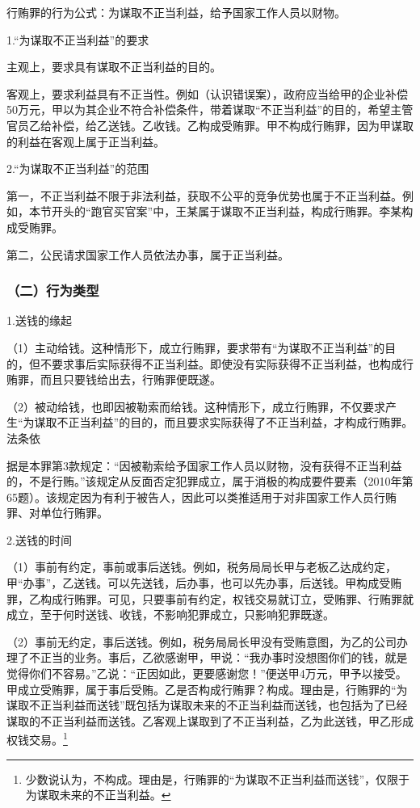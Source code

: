 行贿罪的行为公式：为谋取不正当利益，给予国家工作人员以财物。

1.“为谋取不正当利益”的要求

主观上，要求具有谋取不正当利益的目的。

客观上，要求利益具有不正当性。例如（认识错误案），政府应当给甲的企业补偿50万元，甲以为其企业不符合补偿条件，带着谋取“不正当利益”的目的，希望主管官员乙给补偿，给乙送钱。乙收钱。乙构成受贿罪。甲不构成行贿罪，因为甲谋取的利益在客观上属于正当利益。

2.“为谋取不正当利益”的范围

第一，不正当利益不限于非法利益，获取不公平的竞争优势也属于不正当利益。例如，本节开头的“跑官买官案”中，王某属于谋取不正当利益，构成行贿罪。李某构成受贿罪。

第二，公民请求国家工作人员依法办事，属于正当利益。

\subsubsection*{（二）行为类型}

1.送钱的缘起

（1）主动给钱。这种情形下，成立行贿罪，要求带有“为谋取不正当利益”的目的，但不要求事后实际获得不正当利益。即使没有实际获得不正当利益，也构成行贿罪，而且只要钱给出去，行贿罪便既遂。

（2）被动给钱，也即因被勒索而给钱。这种情形下，成立行贿罪，不仅要求产生“为谋取不正当利益”的目的，而且要求实际获得了不正当利益，才构成行贿罪。法条依

据是本罪第3款规定：“因被勒索给予国家工作人员以财物，没有获得不正当利益的，不是行贿。”该规定从反面否定犯罪成立，属于消极的构成要件要素（2010年第65题）。该规定因为有利于被告人，因此可以类推适用于对非国家工作人员行贿罪、对单位行贿罪。

2.送钱的时间

（1）事前有约定，事前或事后送钱。例如，税务局局长甲与老板乙达成约定，甲“办事”，乙送钱。可以先送钱，后办事，也可以先办事，后送钱。甲构成受贿罪，乙构成行贿罪。可见，只要事前有约定，权钱交易就订立，受贿罪、行贿罪就成立，至于何时送钱、收钱，不影响犯罪成立，只影响犯罪既遂。

（2）事前无约定，事后送钱。例如，税务局局长甲没有受贿意图，为乙的公司办理了不正当的业务。事后，乙欲感谢甲，甲说：“我办事时没想图你们的钱，就是觉得你们不容易。”乙说：“正因如此，更要感谢您！”便送甲4万元，甲予以接受。甲成立受贿罪，属于事后受贿。乙是否构成行贿罪？构成。理由是，行贿罪的“为谋取不正当利益而送钱”既包括为谋取未来的不正当利益而送钱，也包括为了已经谋取的不正当利益而送钱。乙客观上谋取到了不正当利益，乙为此送钱，甲乙形成权钱交易。\footnote{少数说认为，不构成。理由是，行贿罪的“为谋取不正当利益而送钱”，仅限于为谋取未来的不正当利益。}

